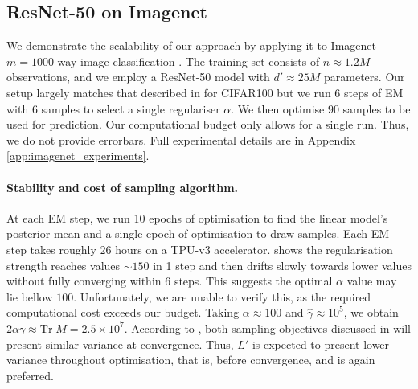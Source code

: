

\subsection{ResNet-50 on Imagenet}
\label{sec:Res50IMAGENET}

We demonstrate the scalability of our approach by applying it to Imagenet $m{=}1000$-way image classification \citep{imagenet}. The training set consists of $n{\approx}1.2M$ observations, and we employ a ResNet-50 model with $d' \approx 25M$ parameters. 
Our setup largely matches that described in  for CIFAR100 but we run 6 steps of EM with 6 samples to select a single regulariser $\alpha$. We then optimise $90$ samples to be used for prediction. Our computational budget only allows for a single run. Thus, we do not provide errorbars. Full experimental details are in Appendix \ref{app:imagenet_experiments}.%



\paragraph{Stability and cost of sampling algorithm.}

At each EM step, we run 10 epochs of optimisation to find the linear model's posterior mean and a single epoch of optimisation to draw samples. Each EM step takes roughly $26$ hours on a TPU-v3 accelerator.  shows the regularisation strength reaches values ${\sim}150$ in 1 step and then drifts slowly towards lower values without fully converging within 6 steps.
This suggests the optimal $\alpha$ value may lie bellow $100$. Unfortunately, we are unable to verify this, as the required computational cost exceeds our budget. 
Taking $\alpha \approx 100$ and $\hat{\gamma} \approx 10^5$, we obtain $2 \alpha \gamma \approx \mathrm{Tr} \;M = 2.5\times 10^7$. According to , both sampling objectives discussed in  will present similar variance at convergence. Thus, $L'$ is expected to present lower variance throughout optimisation, that is, before convergence, and is again preferred. 

